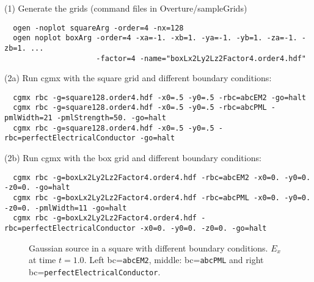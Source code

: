 \documentclass{article}
\begin{document}
\noindent (1) Generate the grids (command files in Overture/sampleGrids)
{\small
\begin{verbatim}
  ogen -noplot squareArg -order=4 -nx=128
  ogen noplot boxArg -order=4 -xa=-1. -xb=1. -ya=-1. -yb=1. -za=-1. -zb=1. ...
                     -factor=4 -name="boxLx2Ly2Lz2Factor4.order4.hdf"
\end{verbatim}
}
\noindent (2a) Run cgmx with the square grid and different boundary conditions: 
{\small
\begin{verbatim}
  cgmx rbc -g=square128.order4.hdf -x0=.5 -y0=.5 -rbc=abcEM2 -go=halt
  cgmx rbc -g=square128.order4.hdf -x0=.5 -y0=.5 -rbc=abcPML -pmlWidth=21 -pmlStrength=50. -go=halt
  cgmx rbc -g=square128.order4.hdf -x0=.5 -y0=.5 -rbc=perfectElectricalConductor -go=halt  
\end{verbatim}
}
\noindent (2b) Run cgmx with the box grid and different boundary conditions: 
{\small
\begin{verbatim}
  cgmx rbc -g=boxLx2Ly2Lz2Factor4.order4.hdf -rbc=abcEM2 -x0=0. -y0=0. -z0=0. -go=halt
  cgmx rbc -g=boxLx2Ly2Lz2Factor4.order4.hdf -rbc=abcPML -x0=0. -y0=0. -z0=0. -pmlWidth=11 -go=halt
  cgmx rbc -g=boxLx2Ly2Lz2Factor4.order4.hdf -rbc=perfectElectricalConductor -x0=0. -y0=0. -z0=0. -go=halt
\end{verbatim}
}
{
\begin{figure}[hbt]
\newcommand{\figWidth}{5.5cm}
\newcommand{\trimfig}[2]{\trimFig{#1}{#2}{0.1}{0.05}{.05}{.05}}
\begin{center}
\end{center}
\caption{Gaussian source in a square with different boundary conditions. $E_x$ at time $t=1.0$. Left bc={\tt abcEM2}, middle: bc={\tt abcPML} and
right bc={\tt perfectElectricalConductor}. }
\label{fig:rbcSquare}
\end{figure}
}
\end{document}
